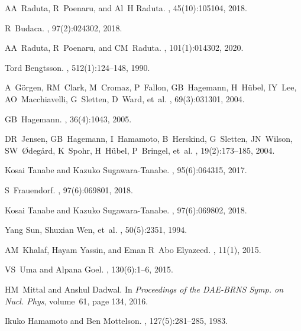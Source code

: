 \documentclass[myclassdoc,debug]{rjparticle}
\begin{document}
\begin{thebibliography}{99}
AA~Raduta, R~Poenaru, and Al~H Raduta.
,
  45(10):105104, 2018.

R~Budaca.
, 97(2):024302, 2018.

AA~Raduta, R~Poenaru, and CM~Raduta.
, 101(1):014302, 2020.

Tord Bengtsson.
, 512(1):124--148, 1990.

A~G{\"o}rgen, RM~Clark, M~Cromaz, P~Fallon, GB~Hagemann, H~H{\"u}bel, IY~Lee,
  AO~Macchiavelli, G~Sletten, D~Ward, et~al.
, 69(3):031301, 2004.

GB~Hagemann.
, 36(4):1043, 2005.

DR~Jensen, GB~Hagemann, I~Hamamoto, B~Herskind, G~Sletten, JN~Wilson,
  SW~{\O}deg{\aa}rd, K~Spohr, H~H{\"u}bel, P~Bringel, et~al.
,
  19(2):173--185, 2004.

Kosai Tanabe and Kazuko Sugawara-Tanabe.
, 95(6):064315, 2017.

S~Frauendorf.
, 97(6):069801, 2018.

Kosai Tanabe and Kazuko Sugawara-Tanabe.
, 97(6):069802, 2018.

Yang Sun, Shuxian Wen, et~al.
, 50(5):2351, 1994.

AM~Khalaf, Hayam Yassin, and Eman R~Abo Elyazeed.
, 11(1), 2015.

VS~Uma and Alpana Goel.
, 130(6):1--6, 2015.

HM~Mittal and Anshul Dadwal.
\newblock In {\em Proceedings of the DAE-BRNS Symp. on Nucl. Phys}, volume~61,
  page 134, 2016.

Ikuko Hamamoto and Ben Mottelson.
, 127(5):281--285, 1983.


\end{thebibliography}
\end{document}
